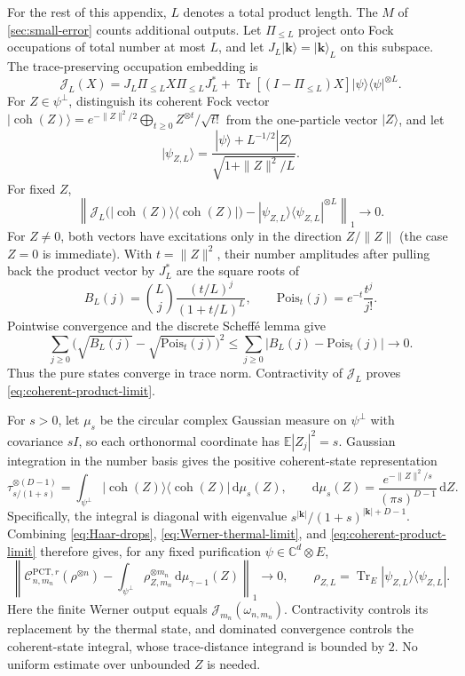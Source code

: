 \documentclass[11pt]{article}
\theoremstyle{remark}
\theoremstyle{plain}
\newcommand{\C}{\mathbb C}
\newcommand{\cC}{\mathcal C}
\newcommand{\dd}{\mathrm d}
\newcommand{\Tr}{\operatorname{Tr}}
\newcommand{\ket}[1]{|#1\rangle}
\newcommand{\proj}[1]{|#1\rangle\!\langle #1|}
\newcommand{\ot}{\otimes}
\begin{document}
For the rest of this appendix, \(L\) denotes a total product length.
The \(M\) of \cref{sec:small-error} counts additional outputs.
Let \(\Pi_{\le L}\) project onto Fock occupations of total number at
most \(L\), and let \(J_L\ket{\mathbf k}=\ket{\mathbf k}_L\) on this
subspace.
The trace-preserving occupation embedding is
\begin{equation}\label{eq:occupation-channel}
  \mathcal J_L(X)
  =J_L\Pi_{\le L}X\Pi_{\le L}J_L^*
   +\Tr[(I-\Pi_{\le L})X]\proj\psi^{\ot L}.
\end{equation}
For \(Z\in\psi^\perp\), distinguish its coherent Fock vector
\(\ket{\operatorname{coh}(Z)}
  =e^{-\|Z\|^2/2}\bigoplus_{t\ge0}Z^{\ot t}/\sqrt{t!}\)
from the one-particle vector \(\ket Z\),
and let
\[
  \ket{\psi_{Z,L}}
  =\frac{\ket\psi+L^{-1/2}\ket Z}
         {\sqrt{1+\|Z\|^2/L}}.
\]
For fixed \(Z\),
\begin{equation}\label{eq:coherent-product-limit}
  \left\|
    \mathcal J_L\bigl(\proj{\operatorname{coh}(Z)}\bigr)
    -\proj{\psi_{Z,L}}^{\ot L}
  \right\|_1\longrightarrow0.
\end{equation}
For \(Z\ne0\), both vectors have excitations only in the direction
\(Z/\|Z\|\) (the case \(Z=0\) is immediate).  With \(t=\|Z\|^2\),
their number amplitudes after pulling
back the product vector by \(J_L^*\) are the square roots of
\[
  B_L(j)=\binom Lj\frac{(t/L)^j}{(1+t/L)^L},
  \qquad
  \mathrm{Pois}_t(j)=e^{-t}\frac{t^j}{j!}.
\]
Pointwise convergence and the discrete Scheff\'e lemma give
\[
  \sum_{j\ge0}\bigl(\sqrt{B_L(j)}-\sqrt{\mathrm{Pois}_t(j)}\bigr)^2
  \le\sum_{j\ge0}|B_L(j)-\mathrm{Pois}_t(j)|\longrightarrow0.
\]
Thus the pure states converge in trace norm. Contractivity of
\(\mathcal J_L\) proves \eqref{eq:coherent-product-limit}.

For \(s>0\), let \(\mu_s\) be the circular complex Gaussian measure
on \(\psi^\perp\) with covariance \(sI\), so each orthonormal coordinate has
\(\mathbb E|Z_j|^2=s\).  Gaussian integration in the number basis gives
the positive coherent-state representation
\begin{equation}\label{eq:pct-coherent-mixture}
  \tau_{s/(1+s)}^{\ot(D-1)}
  =\int_{\psi^\perp}\proj{\operatorname{coh}(Z)}\,\dd\mu_s(Z),
  \qquad
  \dd\mu_s(Z)=\frac{e^{-\|Z\|^2/s}}{(\pi s)^{D-1}}\,\dd Z.
\end{equation}
Specifically, the integral is diagonal with eigenvalue
\(s^{|\mathbf k|}/(1+s)^{|\mathbf k|+D-1}\).
Combining \eqref{eq:Haar-drops}, \eqref{eq:Werner-thermal-limit},
and \eqref{eq:coherent-product-limit} therefore gives, for any fixed
purification \(\psi\in\C^d\ot E\),
\begin{equation}\label{eq:pct-product-mixture}
  \left\|
    \cC_{n,m_n}^{\mathrm{PCT},r}(\rho^{\ot n})
    -\int_{\psi^\perp}\rho_{Z,m_n}^{\ot m_n}\,\dd\mu_{\gamma-1}(Z)
  \right\|_1\longrightarrow0,
  \qquad
  \rho_{Z,L}=\Tr_E\proj{\psi_{Z,L}}.
\end{equation}
Here the finite Werner output equals
\(\mathcal J_{m_n}(\omega_{n,m_n})\).  Contractivity controls its
replacement by the thermal state, and dominated convergence controls
the coherent-state integral, whose trace-distance integrand is bounded
by \(2\).  No uniform estimate over unbounded \(Z\) is needed.
\end{document}
